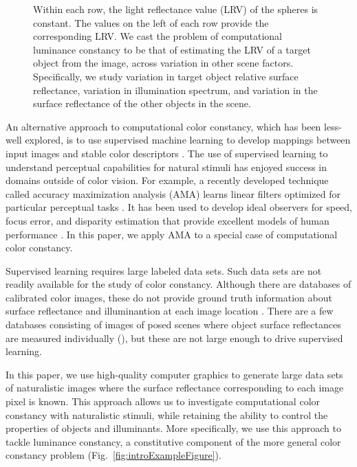 \documentclass{jov}
\begin{document}
\begin{figure}
{Within each row, the light reflectance value (LRV) of the spheres is constant. The values on the left of each row provide the corresponding LRV. We cast the problem of computational luminance constancy to be that of estimating the LRV of a target object from the image, across variation in other scene factors. Specifically, we study variation in target object relative surface reflectance, variation in illumination spectrum, and variation in the surface reflectance of the other objects in the scene.}
 \end{figure}

An alternative approach to computational color constancy, which has been less-well explored, is to use supervised machine learning to develop mappings between input images and stable color descriptors \cite{barron2015convolutional}. The use of supervised learning to understand perceptual capabilities for natural stimuli has enjoyed success in domains outside of color vision. For example, a recently developed technique called accuracy maximization analysis (AMA) learns linear filters optimized for particular perceptual tasks \cite{geisler2009optimal}. It has been used to develop ideal observers for speed, focus error, and disparity estimation that provide excellent models of human performance \cite{burge2011optimal, burge2014optimal, burge2015optimal}. In this paper, we apply AMA to a special case of computational color constancy. 

Supervised learning requires large labeled data sets.  Such data sets are not readily available for the study of color constancy. Although there are databases of calibrated color images, these do not provide ground truth information about surface reflectance and illuminantion at each image location \cite{ChakrabartiHyperspectral,NascimentoFoster2016,ParragaHyperspectralData,TkacikUpennHypersepctralData,skauli2013collection,olmos2004biologically}. There are a few databases consisting of images of posed scenes where object surface reflectances are measured individually (), but these are not large enough to drive supervised learning.
 
In this paper, we use high-quality computer graphics to generate large data sets of naturalistic images where the surface reflectance corresponding to each image pixel is known. 
This approach allows us to investigate computational color constancy with naturalistic stimuli, while retaining the ability to control the properties of objects and illuminants. More specifically, we use this approach to tackle luminance constancy, a constitutive component of the more general color constancy problem (Fig.~\ref{fig:introExampleFigure}). 
\end{document}
